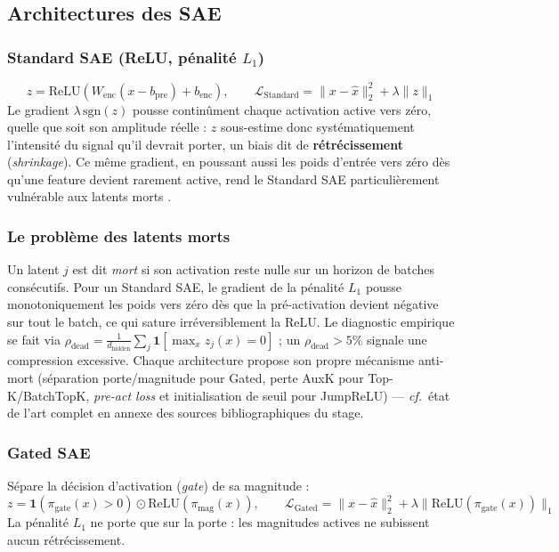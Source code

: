 \documentclass[11pt]{article}
\newcommand{\ind}{\mathbf{1}}
\begin{document}
\subsection{Architectures des SAE}

\subsubsection{Standard SAE (ReLU, pénalité $L_1$)}
\[
  z = \text{ReLU}(W_\text{enc}(x - b_\text{pre}) + b_\text{enc}), \qquad
  \mathcal{L}_\text{Standard} = \|x - \hat{x}\|_2^2 + \lambda \|z\|_1
\]
Le gradient $\lambda\,\text{sgn}(z)$ pousse continûment chaque activation
active vers zéro, quelle que soit son amplitude réelle : $z$ sous-estime donc
systématiquement l'intensité du signal qu'il devrait porter, un biais dit de
\textbf{rétrécissement} (\emph{shrinkage}). Ce même gradient, en poussant
aussi les poids d'entrée vers zéro dès qu'une feature devient rarement
active, rend le Standard SAE particulièrement vulnérable aux latents morts
\cite{cunningham2023sparse}.


\subsubsection{Le problème des latents morts}

Un latent $j$ est dit \emph{mort} si son activation reste nulle sur un
horizon de batches consécutifs. Pour un Standard SAE, le gradient de la
pénalité $L_1$ pousse monotoniquement les poids vers zéro dès que la
pré-activation devient négative sur tout le batch, ce qui sature
irréversiblement la ReLU. Le diagnostic empirique se fait via
$\rho_\text{dead} = \frac{1}{d_\text{hidden}} \sum_j \ind[\max_x z_j(x) = 0]$ ;
un $\rho_\text{dead} > 5\%$ signale une compression excessive. Chaque
architecture propose son propre mécanisme anti-mort (séparation porte/magnitude
pour Gated, perte AuxK pour Top-K/BatchTopK, \emph{pre-act loss} et
initialisation de seuil pour JumpReLU) --- \emph{cf.}~état de l'art complet en
annexe des sources bibliographiques du stage.

\subsubsection{Gated SAE}
Sépare la décision d'activation (\emph{gate}) de sa magnitude
\cite{rajamanoharan2024gated} :
\[
  z = \ind(\pi_\text{gate}(x) > 0) \odot \text{ReLU}(\pi_\text{mag}(x)), \qquad
  \mathcal{L}_\text{Gated} = \|x - \hat{x}\|_2^2 + \lambda \|\text{ReLU}(\pi_\text{gate}(x))\|_1
\]
La pénalité $L_1$ ne porte que sur la porte : les magnitudes actives ne
subissent aucun rétrécissement.
\end{document}
